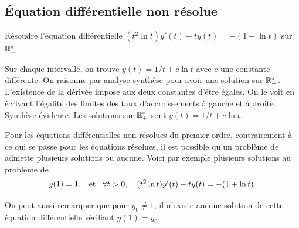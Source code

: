 \documentclass{magnoliaold}
\begin{document}
\subsection{Équation différentielle non résolue}

\begin{exoUnique}
\exo Résoudre l'équation différentielle
  $(t^2\ln t)y'(t)-ty(t)=-(1+\ln t)$ sur $\mathbb{R}_+^*$.
  \begin{sol}
  Sur chaque intervalle, on trouve $y(t)=1/t+c\ln t$ avec $c$ une constante différente. On raisonne par analyse-synthèse pour avoir une solution sur $\mathbb{R}_+^*$. L'existence de la dérivée impose aux deux constantes d'être égales. On le voit en écrivant l'égalité des limites des taux d'accroissements à gauche et à droite. Synthèse évidente. Les solutions sur $\mathbb{R}_+^*$
  sont $y(t)=1/t+c\ln t$.
  \end{sol}
\end{exoUnique}

\begin{remarqueUnique}
\remarque Pour les équations différentielles non résolues du premier ordre, 
  contrairement à ce qui se passe pour les équations résolues, il est possible
  qu'un problème de  admette plusieurs solutions ou aucune. Voici par exemple
  plusieurs solutions au problème de 
  \[y(1)=1, \quad\!\text{et}\quad\! \forall t>0,\quad (t^2\ln t)y'(t)-ty(t)=-(1+\ln t).\]
\begin{center}
\end{center}
  On peut aussi remarquer que pour $y_0\neq 1$, il n'existe aucune solution de cette équation différentielle
  vérifiant $y(1)=y_0$.
\end{remarqueUnique}
\end{document}
